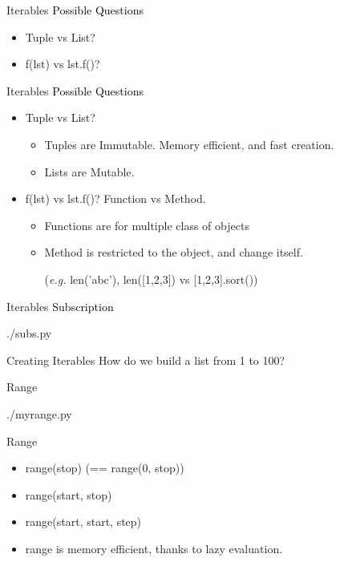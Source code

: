\documentclass{beamer}
\begin{document}
\begin{frame}{Iterables}
  \textcolor{black}{\large{Possible Questions}}
  \begin{itemize}
    \item Tuple vs List?
    \item f(lst) vs lst.f()?
  \end{itemize}
\end{frame}

\begin{frame}{Iterables}
  \textcolor{black}{\large{Possible Questions}}
  \begin{itemize}
    \item Tuple vs List?
      \begin{itemize}
        \item Tuples are Immutable. Memory efficient, and fast creation.
        \item Lists are Mutable.
      \end{itemize}

    \item f(lst) vs lst.f()?
      Function vs Method. 
      \begin{itemize}
        \item Functions are for multiple class of objects
        \item Method is restricted to the object, and change itself. 
          
          (\textit{e.g.} len('abc'), len([1,2,3]) vs [1,2,3].sort())
      \end{itemize}
  \end{itemize}
\end{frame}

\begin{frame}{Iterables}
  \textcolor{black}{\large{Subscription}}
  \begin{lstinputlisting}
    {./subs.py}
  \end{lstinputlisting}
\end{frame}

\begin{frame}{Creating Iterables}
  How do we build a list from 1 to 100?
\end{frame}

\begin{frame}{Range}
  \begin{lstinputlisting}
    {./myrange.py}
  \end{lstinputlisting}
\end{frame}

\begin{frame}{Range}
  \begin{itemize}
    \item range(stop) (== range(0, stop))
    \item range(start, stop)
    \item range(start, start, step)
    \item range is memory efficient, thanks to lazy evaluation.
  \end{itemize}
\end{frame}
\end{document}
